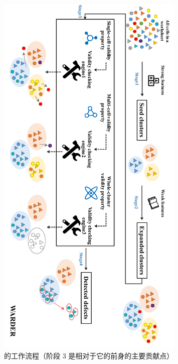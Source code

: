 \begin{figure}[tbp]    
    \centering
    \includegraphics[width=0.8\textwidth]{figure/figure1-copy.pdf}
    \caption{\wa 的工作流程（阶段 3 是相对于它的前身\cu 的主要贡献点）}
    \label{figure1}
\end{figure}